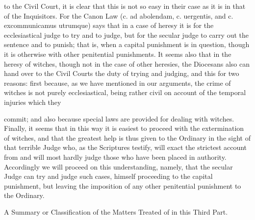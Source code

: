        to the Civil Court, it is clear that this is not so easy in their case as it is in that of the
       Inquisitors. For the Canon Law (c. ad abolendam, c. uergentis, and c. excommunicamus
       utrumque) says that in a case of heresy it is for the ecclesiastical judge to try and to judge,
       but for the secular judge to carry out the sentence and to punish; that is, when a capital
       punishment is in question, though it is otherwise with other penitential punishments.
             It seems also that in the heresy of witches, though not in the case of other heresies, the
       Diocesans also can hand over to the Civil Courts the duty of trying and judging, and this for
       two reasons: first because, as we have mentioned in our arguments, the crime of witches is
       not purely ecclesiastical, being rather civil on account of the temporal injuries which they

       commit; and also because special laws are provided for dealing with witches.
            Finally, it seems that in this way it is easiest to proceed with the extermination of
       witches, and that the greatest help is thus given to the Ordinary in the sight of that terrible
       Judge who, as the Scriptures testify, will exact the strictest account from and will most
       hardly judge those who have been placed in authority. Accordingly we will proceed on this
       understanding, namely, that the secular Judge can try and judge such cases, himself
       proceeding to the capital punishment, but leaving the imposition of any other penitential
       punishment to the Ordinary.

                     A Summary or Classification of the Matters Treated of in this Third Part.

